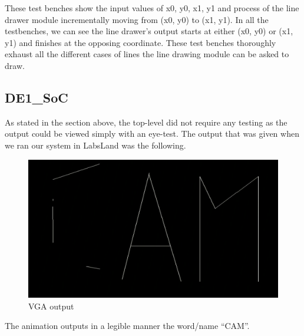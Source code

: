 \documentclass[11pt, titlepage]{article}
\begin{document}
            These test benches show the input values of x0, y0, x1, y1 and process of the line drawer module incrementally moving from (x0, y0) to (x1, y1). In all the testbenches, we can see the line drawer's output starts at either (x0, y0) or (x1, y1) and finishes at the opposing coordinate. These test benches thoroughly exhaust all the different cases of lines the line drawing module can be asked to draw. 

        \subsection{DE1\_SoC}
            As stated in the section above, the top-level did not require any testing as the output could be viewed simply with an eye-test. The output that was given when we ran our system in LabsLand was the following. \\
            \begin{figure}[H]
                \centering
                \includegraphics[scale = 0.5]{Images/VGA output.png}
                \caption{VGA output}
            \end{figure}
            The animation outputs in a legible manner the word/name “CAM”.
        \newpage
\end{document}
